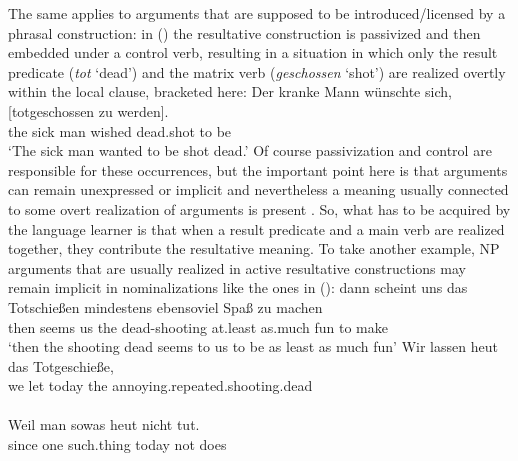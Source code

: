 \begin{exe}
\begin{xlist}[iv.]
\begin{exe}
\begin{xlist}[iv.]
The same applies to arguments that are supposed to be introduced/licensed by a phras\-al construction:
in () the resultative construction is passivized and then embedded under a control
verb, resulting in a situation in which only the result predicate (\emph{tot} `dead') and the matrix verb (\emph{geschossen} `shot') are
realized overtly within the local clause, bracketed here:
\ea
\gll Der kranke Mann wünschte sich,   [totgeschossen zu werden].\footnotemark\\
     the sick   man  wished   \self{} \spacebr{}dead.shot      to be\\
\glt `The sick man wanted to be shot dead.'
\z
\largerpage
Of course passivization and control are responsible for these occurrences, but the important point
here is that arguments can remain unexpressed or implicit and nevertheless a meaning usually
connected to some overt realization of arguments is present \citep[Section~4]{Mueller2007d}. So,
what has to be acquired by the language learner is that when a result predicate and a main verb are
realized together, they contribute the resultative meaning.  
To take another example, NP arguments that are usually realized in active resultative constructions may remain implicit
in nominalizations like the ones in ():
\eal
\label{ex-tot-schiessen}
\ex 
\gll dann scheint uns das Totschießen mindestens ebensoviel Spaß zu machen\footnotemark\hspace{-3mm}\\
     then seems   us  the dead-shooting at.least as.much    fun to make\\
\glt `then the shooting dead seems to us to be as least as much fun'
\ex
\gll Wir lassen heut das Totgeschieße,\\                   
we  let    today the annoying.repeated.shooting.dead\\\\
\gll  Weil  man sowas heut nicht tut.\\
      since one such.thing today not does\\\\

\end{xlist}
\end{exe}
\end{xlist}
\end{exe}
